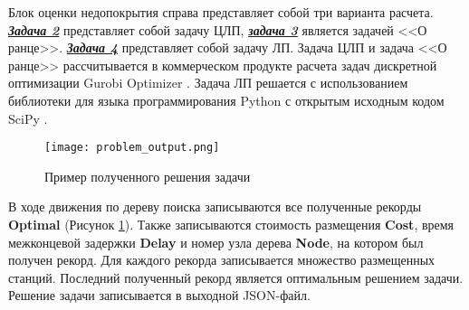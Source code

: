 Блок оценки недопокрытия справа представляет собой три варианта расчета. \underline{\textit{\textbf{Задача 2}}} представляет собой задачу ЦЛП, \underline{\textit{\textbf{задача 3}}} является задачей <<О ранце>>. \underline{\textit{\textbf{Задача 4}}} представляет собой задачу ЛП. Задача ЦЛП и задача <<О ранце>> рассчитывается в коммерческом продукте расчета задач дискретной оптимизации Gurobi Optimizer \cite{gurobi}. Задача ЛП решается с использованием библиотеки для языка программирования Python с открытым исходным кодом SciPy \cite{scipy}. 


\begin{figure}[h!]
  \centering
   \texttt{[image: problem\_output.png]}
\caption{Пример полученного решения задачи}
\label{fig:part4_problem_output}
\end{figure}

В ходе движения по дереву поиска записываются все полученные рекорды \textbf{Optimal} (Рисунок \cref{fig:part4_problem_output}). Также записываются стоимость размещения \textbf{Cost}, время межконцевой задержки \textbf{Delay} и номер узла дерева \textbf{Node}, на котором был получен рекорд. Для каждого рекорда записывается множество размещенных станций. Последний полученный рекорд является оптимальным решением задачи. Решение задачи записывается в выходной JSON-файл.







